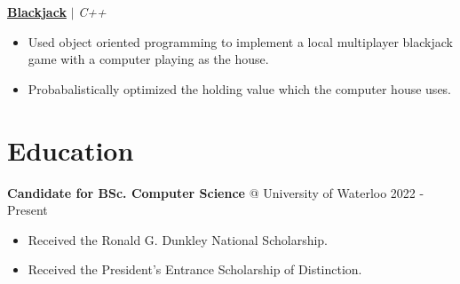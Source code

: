 \documentclass{article}
\makeatletter
\newcommand{\smallbullet}{\,\begin{picture}(-1,1)(-1,-3)\circle*{3}\end{picture}\ }
\newenvironment{resumeItem}
{
    \vspace{0.5em}
}
{
}
\newcommand{\projectHead}[3]{
    \textbf{#1} $\vert$ \textit{#2} \\[-1.2em]
}
\newcommand{\experienceHead}[4]{
    \textbf{#1} @ #2 \hfill #3 \\[-1.2em]
}
\newenvironment{resumeList}
{
    \begin{itemize}[label=\smallbullet]
}
{
    \end{itemize}
}
\makeatother
\begin{document}
\begin{resumeItem}
\projectHead{\href{https://github.com/arnavcs/black-jack}{Blackjack}}{C++}{Apr 2021 - Jul 2021}
\begin{resumeList}
    \item Used object oriented programming to implement a local multiplayer blackjack game with a computer playing as the house.
    \item Probabalistically optimized the holding value which the computer house uses.
\end{resumeList}
\end{resumeItem}

    

\section{Education}

\begin{resumeItem}
\experienceHead{Candidate for BSc. Computer Science}{University of Waterloo}{2022 - Present}{Waterloo, ON.}
\begin{resumeList}
    \item Received the Ronald G. Dunkley National Scholarship.
    \item Received the President's Entrance Scholarship of Distinction.
\end{resumeList}
\end{resumeItem}


\end{document}
